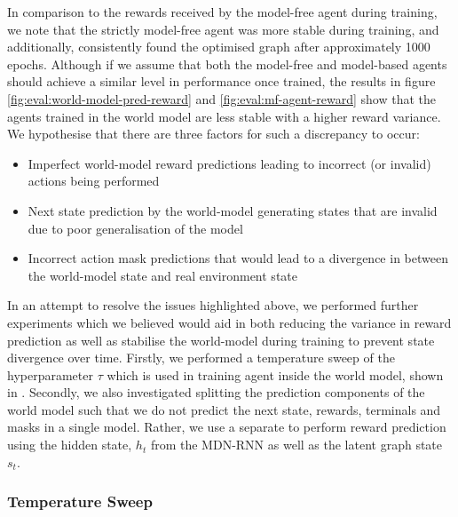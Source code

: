 In comparison to the rewards received by the model-free agent during training, we note that the strictly model-free agent was more stable during training, and additionally, consistently found the optimised graph after approximately 1000 epochs. Although if we assume that both the model-free and model-based agents should achieve a similar level in performance once trained, the results in figure \ref{fig:eval:world-model-pred-reward} and \ref{fig:eval:mf-agent-reward} show that the agents trained in the world model are less stable with a higher reward variance. We hypothesise that there are three factors for such a discrepancy to occur:

\begin{itemize}
  \item Imperfect world-model reward predictions leading to incorrect (or invalid) actions being performed
  \item Next state prediction by the world-model generating states that are invalid due to poor generalisation of the model
  \item Incorrect action mask predictions that would lead to a divergence in between the world-model state and real environment state 
\end{itemize}

In an attempt to resolve the issues highlighted above, we performed further experiments which we believed would aid in both reducing the variance in reward prediction as well as stabilise the world-model during training to prevent state divergence over time. Firstly, we performed a temperature sweep of the hyperparameter $\tau$ which is used in training agent inside the world model, shown in . Secondly, we also investigated splitting the prediction components of the world model such that we do not predict the next state, rewards, terminals and masks in a single model. Rather, we use a separate to perform reward prediction using the hidden state, $h_t$ from the MDN-RNN as well as the latent graph state $s_t$.


\subsubsection{Temperature Sweep}

